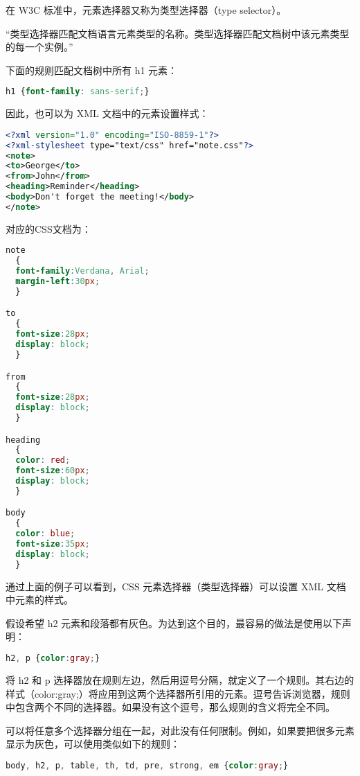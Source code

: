 在 W3C 标准中，元素选择器又称为类型选择器（type selector）。

“类型选择器匹配文档语言元素类型的名称。类型选择器匹配文档树中该元素类型的每一个实例。”


下面的规则匹配文档树中所有 h1 元素：

\begin{lstlisting}[language=CSS]
h1 {font-family: sans-serif;}
\end{lstlisting}

因此，也可以为 XML 文档中的元素设置样式：



\begin{lstlisting}[language=XML]
<?xml version="1.0" encoding="ISO-8859-1"?>
<?xml-stylesheet type="text/css" href="note.css"?>
<note>
<to>George</to>
<from>John</from>
<heading>Reminder</heading>
<body>Don't forget the meeting!</body>
</note>
\end{lstlisting}

对应的CSS文档为：

\begin{lstlisting}[language=CSS]
note
  {
  font-family:Verdana, Arial;
  margin-left:30px;
  }

to
  {
  font-size:28px;
  display: block;
  }

from
  {
  font-size:28px;
  display: block;
  }

heading
  {
  color: red;
  font-size:60px;
  display: block;
  }

body
  {
  color: blue;
  font-size:35px;
  display: block;
  }
\end{lstlisting}

通过上面的例子可以看到，CSS 元素选择器（类型选择器）可以设置 XML 文档中元素的样式。



假设希望 h2 元素和段落都有灰色。为达到这个目的，最容易的做法是使用以下声明：

\begin{lstlisting}[language=CSS]
h2, p {color:gray;}
\end{lstlisting}


将 h2 和 p 选择器放在规则左边，然后用逗号分隔，就定义了一个规则。其右边的样式（color:gray;）将应用到这两个选择器所引用的元素。逗号告诉浏览器，规则中包含两个不同的选择器。如果没有这个逗号，那么规则的含义将完全不同。

可以将任意多个选择器分组在一起，对此没有任何限制。例如，如果要把很多元素显示为灰色，可以使用类似如下的规则：

\begin{lstlisting}[language=CSS]
body, h2, p, table, th, td, pre, strong, em {color:gray;}
\end{lstlisting}



